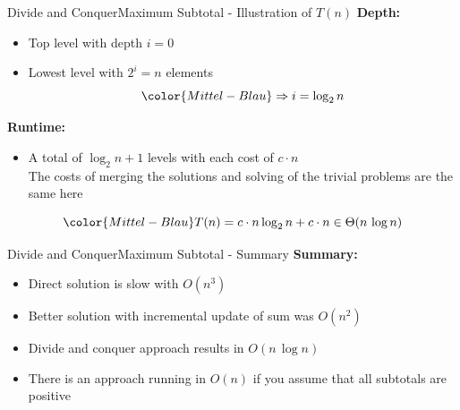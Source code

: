 
\begin{frame}{Divide and Conquer}{Maximum Subtotal - Illustration of $T(n)$}
  \textbf{Depth:}
  \begin{itemize}
    \item<2->
      Top level with depth {\color{Mittel-Blau}$i = 0$}
    \item<3->
      Lowest level with {\color{Mittel-Blau}$2^i = n$} elements
      \begin{displaymath}
        {\color{Mittel-Blau}\Rightarrow i = \log_2 n}
      \end{displaymath}
  \end{itemize}
  \textbf{Runtime:}
  \begin{itemize}
    \item<5->
      A total of {\color{Mittel-Blau}$\log_2 n + 1$} levels with each cost of
      {\color{Mittel-Blau}$c \cdot n$}\\
      \color{gray}
      The costs of merging the solutions and solving of the trivial
      problems are the same here
  \end{itemize}
  \begin{displaymath}
    {\color{Mittel-Blau}
    T(n) = c \cdot n \log_2 n + c \cdot n \in \Theta(n\,\log n)}
  \end{displaymath}
\end{frame}


\begin{frame}{Divide and Conquer}{Maximum Subtotal - Summary}
  \textbf{Summary:}
  \begin{itemize}
    \item<2->
      Direct solution is slow with {\color{Mittel-Blau}$O(n^3)$}
    \item<3->
      Better solution with incremental update of sum was
      {\color{Mittel-Blau}$O(n^2)$}
    \item<4->
      Divide and conquer approach results in
      {\color{Mittel-Blau}$O(n\,\log n)$}
    \item<5->
      There is an approach running in {\color{Mittel-Blau}$O(n)$}
      if you assume that all subtotals are positive
  \end{itemize}
\end{frame}

